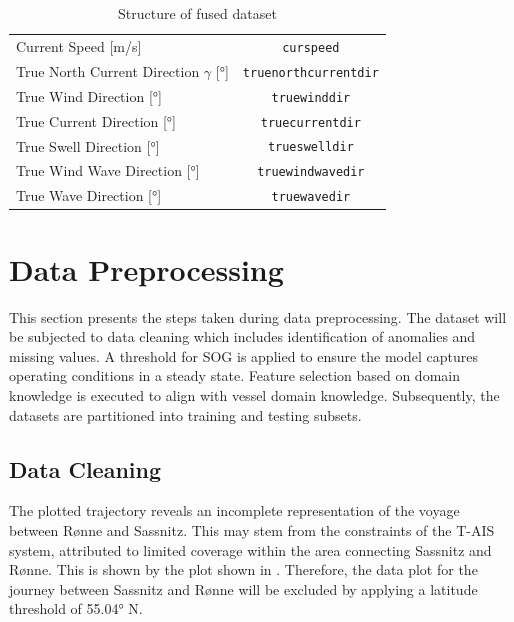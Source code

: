 \begin{table}[h!]
{\begin{tabular}{ p{} c }
    Current Speed [m/s] & {\tt curspeed} \\
    True North Current Direction $\gamma$ [°] & {\tt truenorthcurrentdir}\\
    True Wind Direction [°] & {\tt truewinddir}  \\
    True Current Direction [°] & {\tt truecurrentdir} \\
    True Swell Direction [°] & {\tt trueswelldir} \\
    True Wind Wave Direction [°] & {\tt truewindwavedir} \\
    True Wave Direction [°] & {\tt truewavedir} \\
    \hline
    \end{tabular}}
\caption{Structure of fused dataset}\label{tbl:dataset_init_struct}
\end{table}

\section{Data Preprocessing}\label{sec:data_prep}

This section presents the steps taken during data preprocessing. The dataset will be subjected to data cleaning which includes identification of anomalies and missing values. A threshold for SOG is applied to ensure the model captures operating conditions in a steady state. Feature selection based on domain knowledge is executed to align with vessel domain knowledge. Subsequently, the datasets are partitioned into training and testing subsets.

\subsection{Data Cleaning}\label{sec:data_cleaning}

The plotted trajectory reveals an incomplete representation of the voyage between R{\o}nne and Sassnitz. This may stem from the constraints of the T-AIS system, attributed to limited coverage within the area connecting Sassnitz and R{\o}nne. This is shown by the plot shown in . Therefore, the data plot for the journey between Sassnitz and R{\o}nne will be excluded by applying a latitude threshold of 55.04° N.\\


